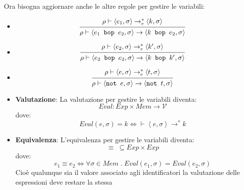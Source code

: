 \documentclass[a4paper]{article}
\begin{document}
\vspace{1em}
\noindent
Ora bisogna aggiornare anche le altre regole per gestire le variabili:
\begin{itemize}
  \item
    \[
      \begin{prooftree}
        \hypo{ 
          \rho \vdash \left< e_1, \sigma \right> \to^*_e \left< k, \sigma \right>
        }
        \infer1{
          \rho \vdash \left< e_1 \texttt{ bop } e_2, \sigma \right> \to
          \left<k \texttt{ bop } e_2, \sigma \right>
        }
      \end{prooftree}
    \] 

  \item
    \[
      \begin{prooftree}
        \hypo{ 
          \rho \vdash \left< e_2, \sigma \right> \to^*_e \left< k', \sigma \right>
        }
        \infer1{ 
          \rho \vdash \left< e_2 \texttt{ bop } e_2, \sigma \right> \to
          \left<k \texttt{ bop } k', \sigma \right>
        }
      \end{prooftree}
    \] 

    \item
      \[
        \begin{prooftree}
          \hypo{ 
            \rho \vdash \left< e, \sigma \right> \to^*_e \left< t, \sigma \right>
          }
          \infer1{ 
            \rho \vdash \left< \texttt{not } e, \sigma \right> \to
            \left<\texttt{not } t, \sigma \right>
          }
        \end{prooftree}
      \] 
\end{itemize}

\vspace{1em}
\noindent
\begin{itemize}
  \item \textbf{Valutazione}: La valutazione per gestire le variabili diventa:
    \[
      Eval: Exp \times Mem \to \mathcal{V}
    \] 
    dove:
    \[
      Eval(e, \sigma) = k \iff \vdash \left< e, \sigma \right> \to^* k
    \] 

  \item \textbf{Equivalenza}: L'equivalenza per gestire le variabili diventa:
    \[
      \equiv \; \subseteq Exp \times Exp
    \]
    dove:
    \[
      e_1 \equiv e_2 \iff \forall \sigma \in Mem \;.\; Eval(e_1, \sigma) = Eval(e_2, \sigma)
    \] 
    Cioè qualunque sia il valore associato agli identificatori la valutazione delle
    espressioni deve restare la stessa
\end{itemize}
\end{document}
